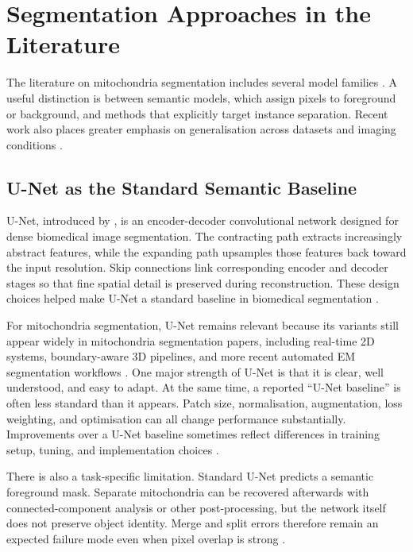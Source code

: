 \documentclass[logo,bsc,singlespacing,parskip,online]{infthesis}
\begin{document}
\section{Segmentation Approaches in the Literature}

The literature on mitochondria segmentation includes several model families \citep{aswath2023segmentation,
conrad2023instance}. A
useful distinction is between semantic models, which assign pixels to
foreground or background, and methods that explicitly target instance
separation. Recent work also places greater emphasis on generalisation across
datasets and imaging conditions \citep{xie2025transfer, huang2025generalist}.

\subsection{U-Net as the Standard Semantic Baseline}

U-Net, introduced by \citet{ronneberger2015unet}, is an encoder-decoder
convolutional network designed for dense biomedical image segmentation. The
contracting path extracts increasingly abstract features, while the expanding
path upsamples those features back toward the input resolution. Skip
connections link corresponding encoder and decoder stages so that fine spatial
detail is preserved during reconstruction. These design choices helped make
U-Net a standard baseline in biomedical segmentation
\citep{ronneberger2015unet, aswath2023segmentation}.

For mitochondria segmentation, U-Net remains relevant because its variants
still appear widely in mitochondria segmentation papers, including
real-time 2D systems, boundary-aware 3D pipelines, and more recent automated
EM segmentation workflows \citep{casser2020fast, wei2020mitoem,
jang2025deep}. One major strength of U-Net is that it is clear, well
understood, and easy to adapt. At the same time, a reported ``U-Net baseline'' is often less standard than
it appears. Patch size, normalisation, augmentation, loss weighting, and
optimisation can all change performance substantially. Improvements over a
U-Net baseline sometimes reflect differences in training setup, tuning, and
implementation choices \citep{isensee2021nnu,
franco-barranco2022stable}.

There is also a task-specific limitation. Standard U-Net predicts a semantic
foreground mask. Separate mitochondria can be recovered afterwards with
connected-component analysis or other post-processing, but the network itself
does not preserve object identity. Merge and split errors therefore remain an
expected failure mode even when pixel overlap is strong
\citep{wei2020mitoem, conrad2023instance}.
\end{document}
